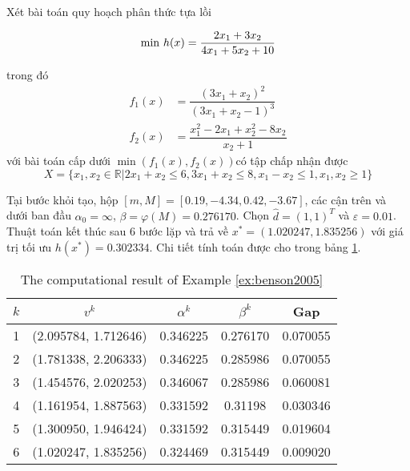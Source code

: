 \begin{vd} Xét bài toán quy hoạch phân thức tựa lồi \label{ex:benson2005}

\noindent 
\begin{align*}
    {\rm min}\  h(x) = \dfrac{2x_1 + 3x_2}{4x_1 + 5x_2 + 10}\\
\end{align*}

trong đó
\begin{align*}
    f_1(x) &= \dfrac{(3x_1+x_2)^2}{(3x_1 +x_2-1)^3}\\
    f_2(x) &= \dfrac{x_{1}^{2}-2x_{1}+x_{2}^{2}-8x_{2}}{x_{2}+1}
\end{align*}
với bài toán cấp dưới $\min (f_1(x), f_2(x))$có tập chấp nhận được $$X = \{x_{1},x_{2}\in\mathbb{R} \vert 2x_{1}+x_{2} \leq 6, 3x_{1}+x_{2}  \leq  8, x_{1}-x_{2}  \leq 1, x_{1},x_{2}  \geq 1\}$$
\end{vd}

Tại bước khỏi tạo, hộp $[m,M]=[0.19,-4.34,0.42,-3.67]$,
các cận trên và dưới ban đầu $\alpha_{0}=\infty$, $\beta=\varphi(M)=0.276170$. Chọn $\hat{d}=(1,1)^{T}$ và $\varepsilon=0.01$.
Thuật toán kết thúc sau 6 bước lặp và trả về $x^{*}=(1.020247, 1.835256)$ với giá trị tối ưu $h(x^{*})=0.302334$. Chi tiết tính toán được cho trong bảng \ref{tab:ex_benson2005}.

\begin{table}[h]
\centering{}\caption{\label{tab:ex_benson2005}The computational result of Example \ref{ex:benson2005}}
\begin{centering}
\begin{tabular}{ccccc}
\hline 
$k$ & $v^{k}$ & $\alpha^{k}$ & $\beta^{k}$ & Gap\tabularnewline
\hline 
\hline 
1 & (2.095784, 1.712646) &  0.346225 & 0.276170 & 0.070055\tabularnewline
\hline 
2 & (1.781338, 2.206333) & 0.346225 & 0.285986 & 0.070055\tabularnewline
\hline 
3 & (1.454576, 2.020253) & 0.346067 & 0.285986 & 0.060081\tabularnewline
\hline 
4 & (1.161954, 1.887563) & 0.331592 & 0.31198 & 0.030346\tabularnewline
\hline 
5 & (1.300950, 1.946424) & 0.331592 & 0.315449 & 0.019604\tabularnewline
\hline 
6 & (1.020247, 1.835256) & 0.324469 & 0.315449 & 0.009020\tabularnewline
\hline 
\end{tabular}
\par\end{centering}
\end{table}

